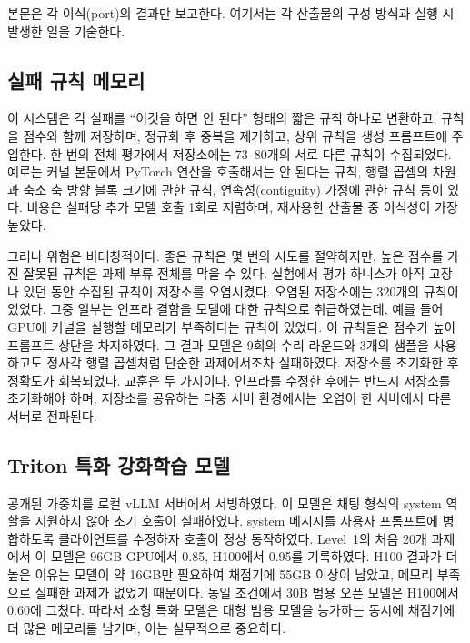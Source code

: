 본문은 각 이식(port)의 결과만 보고한다. 여기서는 각 산출물의 구성 방식과 실행 시 발생한 일을
기술한다.

\subsection{실패 규칙 메모리}
이 시스템은 각 실패를 ``이것을 하면 안 된다'' 형태의 짧은 규칙 하나로 변환하고, 규칙을 점수와 함께
저장하며, 정규화 후 중복을 제거하고, 상위 규칙을 생성 프롬프트에 주입한다. 한 번의 전체 평가에서
저장소에는 73--80개의 서로 다른 규칙이 수집되었다. 예로는 커널 본문에서 PyTorch 연산을 호출해서는
안 된다는 규칙, 행렬 곱셈의 차원과 축소 축 방향 블록 크기에 관한 규칙, 연속성(contiguity) 가정에
관한 규칙 등이 있다. 비용은 실패당 추가 모델 호출 1회로 저렴하며, 재사용한 산출물 중 이식성이
가장 높았다.

그러나 위험은 비대칭적이다. 좋은 규칙은 몇 번의 시도를 절약하지만, 높은 점수를 가진 잘못된 규칙은
과제 부류 전체를 막을 수 있다. 실험에서 평가 하니스가 아직 고장 나 있던 동안 수집된 규칙이 저장소를
오염시켰다. 오염된 저장소에는 320개의 규칙이 있었다. 그중 일부는 인프라 결함을 모델에 대한 규칙으로
취급하였는데, 예를 들어 GPU에 커널을 실행할 메모리가 부족하다는 규칙이 있었다. 이 규칙들은 점수가
높아 프롬프트 상단을 차지하였다. 그 결과 모델은 9회의 수리 라운드와 3개의 샘플을 사용하고도 정사각
행렬 곱셈처럼 단순한 과제에서조차 실패하였다. 저장소를 초기화한 후 정확도가 회복되었다. 교훈은 두
가지이다. 인프라를 수정한 후에는 반드시 저장소를 초기화해야 하며, 저장소를 공유하는 다중 서버
환경에서는 오염이 한 서버에서 다른 서버로 전파된다.

\subsection{Triton 특화 강화학습 모델}
공개된 가중치를 로컬 vLLM 서버에서 서빙하였다. 이 모델은 채팅 형식의 system 역할을 지원하지 않아
초기 호출이 실패하였다. system 메시지를 사용자 프롬프트에 병합하도록 클라이언트를 수정하자 호출이
정상 동작하였다. Level~1의 처음 20개 과제에서 이 모델은 96GB GPU에서 0.85, H100에서 0.95를
기록하였다. H100 결과가 더 높은 이유는 모델이 약 16GB만 필요하여 채점기에 55GB 이상이 남았고,
메모리 부족으로 실패한 과제가 없었기 때문이다. 동일 조건에서 30B 범용 오픈 모델은 H100에서 0.60에
그쳤다. 따라서 소형 특화 모델은 대형 범용 모델을 능가하는 동시에 채점기에 더 많은 메모리를 남기며,
이는 실무적으로 중요하다.

